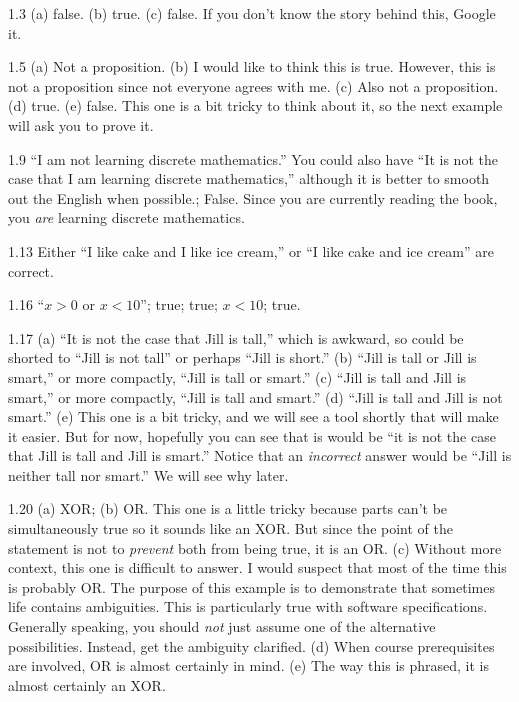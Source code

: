 \begin{Answer}{1.3}
(a) false. (b) true.
(c) false.  If you don't know the story behind this, Google it.
\end{Answer}
\begin{Answer}{1.5}
(a) Not a proposition.
(b) I would like to think this is true.
However, this is not a proposition since not everyone agrees with me.
(c) Also not a proposition.  %
(d) true.
(e) false.  This one is a bit tricky to think about it, so the next example will ask you to prove it.
\end{Answer}
\begin{Answer}{1.9}
``I am not learning discrete mathematics.''
You could also have ``It is not the case that I am learning discrete mathematics,''
although it is better to smooth out the English when possible.;
False.  Since you are currently reading the book, you {\em are} learning discrete mathematics.
\end{Answer}
\begin{Answer}{1.13}
Either
``I like cake and I like ice cream,'' or
``I like cake and ice cream'' are correct.
\end{Answer}
\begin{Answer}{1.16}
``$x>0$ or $x<10$''; true; true; $x<10$; true.
\end{Answer}
\begin{Answer}{1.17}
(a) ``It is not the case that Jill is tall,''
which is awkward, so could be shorted to
``Jill is not tall'' or perhaps ``Jill is short.''
(b) ``Jill is tall or Jill is smart,'' or more compactly,
``Jill is tall or smart.''
(c) ``Jill is tall and Jill is smart,'' or more compactly,
``Jill is tall and smart.''
(d) ``Jill is tall and Jill is not smart.''
(e) This one is a bit tricky, and we will see a tool shortly
that will make it easier. But for now, hopefully you can see
that is would be ``it is not the case that Jill is tall and Jill is smart.''
Notice that an {\em incorrect} answer would be
``Jill is neither tall nor smart.'' We will see why later.
\end{Answer}
\begin{Answer}{1.20}
(a) XOR;
(b) OR.  This one is a little tricky because parts can't be simultaneously true
so it sounds like an XOR.  But since the point of the statement is not to {\em prevent}
both from being true, it is an OR.
(c) Without more context, this one is difficult to answer.  I would suspect that most
of the time this is probably OR.  The purpose of this example is to demonstrate that
sometimes life contains ambiguities.  This is particularly true with software specifications.
Generally speaking, you should {\em not} just assume one of the alternative possibilities.
Instead, get the ambiguity clarified.
(d) When course prerequisites are involved, OR is almost certainly in mind.
(e) The way this is phrased, it is almost certainly an XOR.
\end{Answer}
